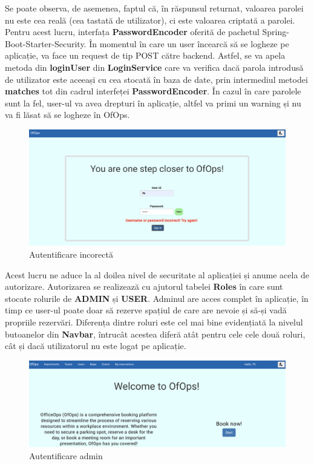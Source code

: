 Se poate observa, de asemenea, faptul că, în răspunsul returnat, valoarea parolei nu este cea reală (cea tastată de utilizator), ci este valoarea criptată a parolei. Pentru acest lucru, interfața \textbf{PasswordEncoder} oferită de pachetul Spring-Boot-Starter-Security. În momentul în care un user încearcă să se logheze pe aplicație, va face un request de tip POST către backend. Astfel, se va apela metoda din \textbf{loginUser} din \textbf{LoginService} care va verifica dacă parola introdusă de utilizator este aceeași cu cea stocată în baza de date, prin intermediul metodei \textbf{matches} tot din cadrul interfeței \textbf{PasswordEncoder}. În cazul în care parolele sunt la fel, user-ul va avea drepturi în aplicație, altfel va primi un warning și nu va fi lăsat să se logheze în OfOps.

\begin{figure}[!htb]
    \centering
    \includegraphics[width=0.9\linewidth]{images/autentificare-gresita.png}
    \caption{Autentificare incorectă}
    \label{fig:autentificare-gresita}
\end{figure}

Acest lucru ne aduce la al doilea nivel de securitate al aplicației și anume acela de autorizare. Autorizarea se realizează cu ajutorul tabelei \textbf{Roles} în care sunt stocate rolurile de \textbf{ADMIN} și \textbf{USER}. Adminul are acces complet în aplicație, în timp ce user-ul poate doar să rezerve spațiul de care are nevoie și să-și vadă propriile rezervări. Diferența dintre roluri este cel mai bine evidențiată la nivelul butoanelor din \textbf{Navbar}, întrucât acestea diferă atât pentru cele cele două roluri, cât și dacă utilizatorul nu este logat pe aplicație. 

\begin{figure}[!htb]
    \centering
    \includegraphics[width=0.9\linewidth]{images/pagina-admin.png}
    \caption{Autentificare admin}
    \label{fig:pagina-admin}
\end{figure}


